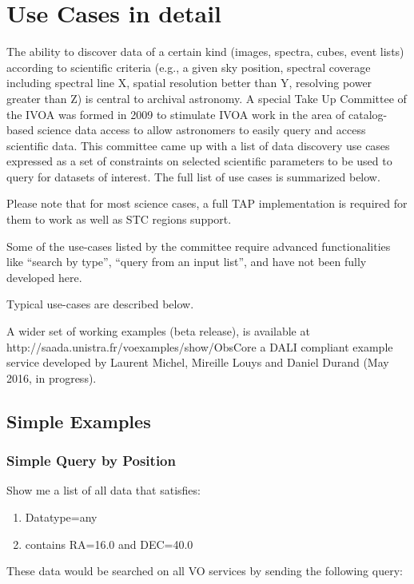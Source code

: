 \documentclass[11pt,a4paper]{ivoa}
\begin{document}


\appendix

\section{Use Cases in detail}
The ability to discover data of a certain kind (images, spectra, cubes, event lists) according to scientific criteria
(e.g., a given sky position, spectral coverage including spectral line X, spatial resolution better than Y, resolving
power greater than Z) is central to archival astronomy. A special Take Up Committee of the IVOA was formed in 2009 to
stimulate IVOA work in the area of catalog-based science data access to allow astronomers to easily query and access
scientific data.  This committee came up with a list of data discovery use cases expressed as a set of constraints on
selected scientific parameters to be used to query for datasets of interest. The full list of use cases is summarized
below.

Please note that for most science cases, a full TAP implementation is required for them to work as well as STC regions
support. \citep{2009ivoa.rept.1030R}

Some of the use-cases listed by the committee require advanced functionalities like ``search by type'', ``query from an
input list'', and have not been fully developed here.

Typical use-cases are described below.

A wider set of working examples (beta release), is available at http://saada.unistra.fr/voexamples/show/ObsCore a DALI
compliant example service developed by Laurent Michel, Mireille Louys and Daniel Durand (May 2016, in progress).

\subsection*{Simple Examples}

\subsubsection*{Simple Query by Position}

Show me a list of all data that satisfies:
\begin{enumerate}
\item Datatype=any
\item contains RA=16.0 and DEC=40.0
\end{enumerate}
These data would be searched on all VO services by sending the following query:
\end{document}
